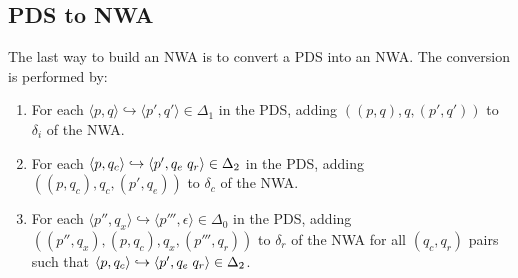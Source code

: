 \documentclass{llncs}
\begin{document}
\subsection{PDS to NWA}
\label{Se:PDStoNWA}

The last way to build an NWA is to convert a PDS into an NWA.  The conversion
is performed by:

\begin{enumerate}

\item For each $\langle p,q \rangle \hookrightarrow \langle p',q' \rangle \in
  \Delta_1$ in the PDS, adding $( (p,q), q, (p',q') )$ to $\delta_i$ of the
  NWA.

\item For each $\langle p,q_c \rangle \hookrightarrow \langle
  p',q_e \hspace{.1cm} q_r \rangle \in \Delta_2$ in the PDS, adding $(
  (p,q_c), q_c, (p',q_e) )$ to $\delta_c$ of the NWA.

\item For each $\langle p'',q_x \rangle \hookrightarrow \langle p''',\epsilon
  \rangle \in \Delta_0$ in the PDS, adding $( (p'',q_x), (p,q_c), q_x,
  (p''',q_r) )$ to $\delta_r$ of the NWA for all $(q_c,q_r)$ pairs such that
  $\langle p,q_c \rangle \hookrightarrow \langle p',q_e \hspace{.1cm} q_r
  \rangle \in \Delta_2$.

\end{enumerate}
\end{document}
